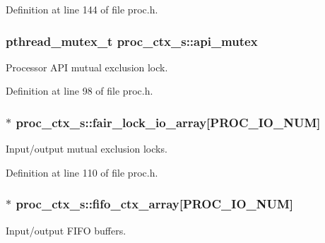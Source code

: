 Definition at line 144 of file proc.\+h.

\subsubsection[{\texorpdfstring{api\+\_\+mutex}{api_mutex}}]{\setlength{\rightskip}{0pt plus 5cm}pthread\+\_\+mutex\+\_\+t proc\+\_\+ctx\+\_\+s\+::api\+\_\+mutex}\hypertarget{structproc__ctx__s_aea90c57d9b0a303b638a51ce7efa9a1e}{}\label{structproc__ctx__s_aea90c57d9b0a303b638a51ce7efa9a1e}
Processor A\+PI mutual exclusion lock. 

Definition at line 98 of file proc.\+h.

\subsubsection[{\texorpdfstring{fair\+\_\+lock\+\_\+io\+\_\+array}{fair_lock_io_array}}]{$\ast$ proc\+\_\+ctx\+\_\+s\+::fair\+\_\+lock\+\_\+io\+\_\+array\mbox{[}P\+R\+O\+C\+\_\+\+I\+O\+\_\+\+N\+UM\mbox{]}}\hypertarget{structproc__ctx__s_a6529e1ba97566c429d658e121bb604bb}{}\label{structproc__ctx__s_a6529e1ba97566c429d658e121bb604bb}
Input/output mutual exclusion locks. 

Definition at line 110 of file proc.\+h.

\subsubsection[{\texorpdfstring{fifo\+\_\+ctx\+\_\+array}{fifo_ctx_array}}]{$\ast$ proc\+\_\+ctx\+\_\+s\+::fifo\+\_\+ctx\+\_\+array\mbox{[}P\+R\+O\+C\+\_\+\+I\+O\+\_\+\+N\+UM\mbox{]}}\hypertarget{structproc__ctx__s_a3b71d039235f439a87d9ec7d7b5b5549}{}\label{structproc__ctx__s_a3b71d039235f439a87d9ec7d7b5b5549}
Input/output F\+I\+FO buffers. 

